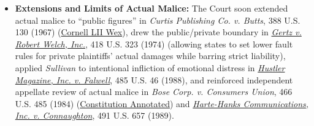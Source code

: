 \documentclass[12pt]{article}
\begin{document}
\begin{itemize}

\item \textbf{Extensions and Limits of Actual Malice:} The Court soon extended actual malice to ``public figures'' in \textit{Curtis Publishing Co. v. Butts}, 388 U.S. 130 (1967) (\href{https://www.law.cornell.edu/wex/defamation}{Cornell LII Wex}), drew the public/private boundary in \textit{\href{https://supreme.justia.com/cases/federal/us/418/323/}{Gertz v. Robert Welch, Inc.}}, 418 U.S. 323 (1974) (allowing states to set lower fault rules for private plaintiffs' actual damages while barring strict liability), applied \textit{Sullivan} to intentional infliction of emotional distress in \textit{\href{https://supreme.justia.com/cases/federal/us/485/46/}{Hustler Magazine, Inc. v. Falwell}}, 485 U.S. 46 (1988), and reinforced independent appellate review of actual malice in \textit{Bose Corp. v. Consumers Union}, 466 U.S. 485 (1984) (\href{https://www.law.cornell.edu/constitution-conan/amendment-1/defamation}{Constitution Annotated}) and \textit{\href{https://supreme.justia.com/cases/federal/us/491/657/}{Harte-Hanks Communications, Inc. v. Connaughton}}, 491 U.S. 657 (1989).

\end{itemize}
\end{document}
